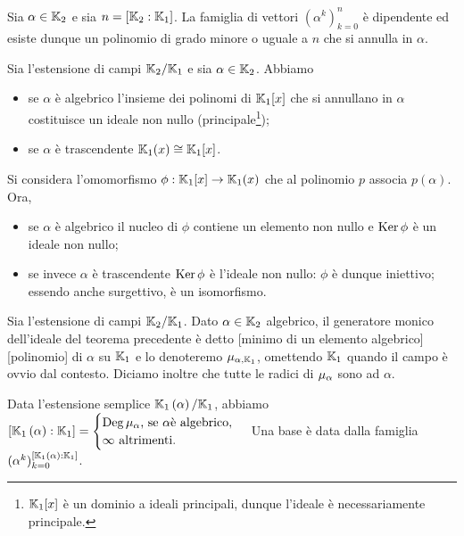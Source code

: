 \Proof Sia $\alpha \in \mathbb{K}_2$ e sia $n = [\mathbb{K}_2:\mathbb{K}_1]$. La famiglia di vettori $(\alpha^k)_{k = 0}^n$ \`e dipendente ed esiste dunque un polinomio di grado minore o uguale a $n$ che si annulla in $\alpha$. \EndProof
\begin{Theorem}
	Sia l'estensione di campi $\mathbb{K}_2/\mathbb{K}_1$ e sia $\alpha \in \mathbb{K}_2$. Abbiamo
	\begin{itemize}
		\item se $\alpha$ \`e algebrico l'insieme dei polinomi di $\mathbb{K}_1[x]$ che si annullano in $\alpha$ costituisce un ideale non nullo (principale\footnote{$\mathbb{K}_1[x]$ \`e un dominio a ideali principali, dunque l'ideale \`e necessariamente principale.});
		\item se $\alpha$ \`e trascendente $\mathbb{K}_1(x) \cong \mathbb{K}_1[x]$.
	\end{itemize}
\end{Theorem}
\Proof Si considera l'omomorfismo $\phi: \mathbb{K}_1[x] \rightarrow \mathbb{K}_1(x)$ che al polinomio $p$ associa $p(\alpha)$. Ora,
\begin{itemize}
	\item se $\alpha$ \`e algebrico il nucleo di $\phi$ contiene un elemento non nullo e $\operatorname{Ker}{\phi}$ \`e un ideale non nullo;
	\item se invece $\alpha$ \`e trascendente $\operatorname{Ker}{\phi}$ \`e l'ideale non nullo: $\phi$ \`e dunque iniettivo; essendo anche surgettivo, \`e un isomorfismo. \EndProof
\end{itemize}
\begin{Definition}
	Sia l'estensione di campi $\mathbb{K}_2/\mathbb{K}_1$. Dato $\alpha \in \mathbb{K}_2$ algebrico, il generatore monico dell'ideale del teorema precedente \`e detto
  [minimo di un elemento algebrico][polinomio]
  di $\alpha$ su $\mathbb{K}_1$ e lo denoteremo $\MinimalPolynomial{\alpha}[\Field_1]$, omettendo $\mathbb{K}_1$ quando il campo \`e ovvio dal contesto. Diciamo inoltre che tutte le radici di $\MinimalPolynomial{\alpha}$ sono  ad $\alpha$.
\end{Definition}
\begin{Theorem}
	Data l'estensione semplice $\mathbb{K}_1 \left ( \alpha \right )/\mathbb{K}_1$, abbiamo $\FieldDegree{\FieldAdjunction{\Field_1}{\alpha}}{\Field_1} = \begin{cases} \Deg \MinimalPolynomial{\alpha}\text{, se } \alpha \text{\`e algebrico},\\ \infty\text{ altrimenti}. \end{cases}$ Una base \`e data dalla famiglia $(\alpha^k)_{k = 0}^{[\mathbb{K}_1 \left ( \alpha \right ):\mathbb{K}_1]}$.
\end{Theorem}
